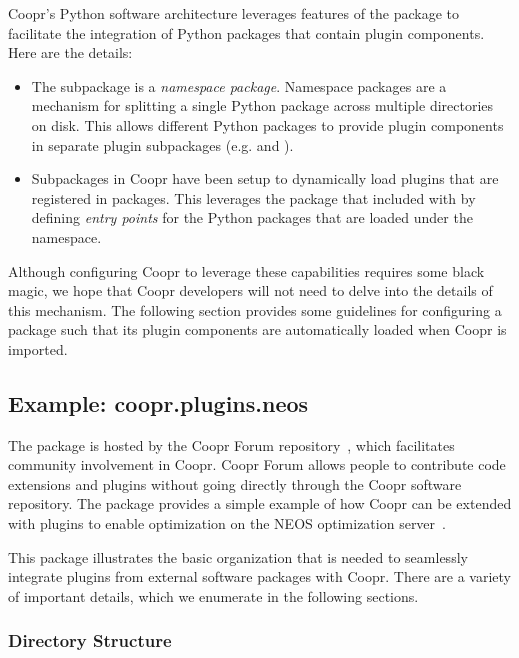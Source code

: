 Coopr's Python software architecture leverages features of the
 package to facilitate the integration of Python packages that contain plugin components.  Here are the details:
\begin{itemize}

\item The  subpackage is a \textit{namespace package}.
Namespace packages are a mechanism for splitting a single Python package
across multiple directories on disk.  This allows different Python packages to provide plugin components in separate plugin subpackages (e.g.  and ).

\item Subpackages in Coopr have been setup to dynamically load plugins
that are registered in  packages.  This leverages the  package that included with  by defining \textit{entry points} for the Python packages that are loaded
under the  namespace.

\end{itemize}
Although configuring Coopr to leverage these capabilities requires some
black magic, we hope that Coopr developers will not need to delve into
the details of this mechanism.  The following section provides some
guidelines for configuring a package such that its plugin components
are automatically loaded when Coopr is imported.


\subsection{Example: coopr.plugins.neos}

The  package is hosted by the Coopr Forum
repository~\cite{CooprForum}, which facilitates community involvement in Coopr.  Coopr Forum
allows people to contribute code extensions and plugins without going
directly through the Coopr software repository.  The  package
provides a simple example of how Coopr can be extended with plugins to enable optimization
on the NEOS optimization server~\cite{NEOS}.

This package illustrates the basic organization that is needed to seamlessly integrate plugins from external software packages with Coopr.  There are a variety of important details, which we enumerate in the following sections.

\subsubsection{Directory Structure}

